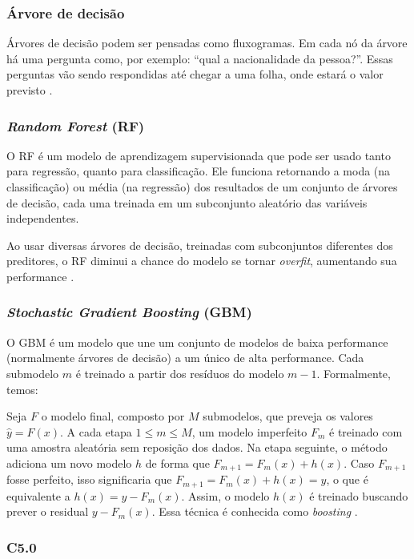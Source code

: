 \documentclass[a4paper,titlepage]{ppgi}\usepackage[]{graphicx}\usepackage[]{color}
\begin{document}
\subsubsection{Árvore de decisão}

Árvores de decisão podem ser pensadas como fluxogramas. Em cada nó da árvore há
uma pergunta como, por exemplo: ``qual a nacionalidade da pessoa?''. Essas
perguntas vão sendo respondidas até chegar a uma folha, onde estará o valor
previsto \cite{Kuhn2013}.

\subsubsection{\emph{Random Forest} (RF)}

O \gls{RF} é um modelo de aprendizagem supervisionada que pode ser usado tanto
para regressão, quanto para classificação. Ele funciona retornando a moda (na
classificação) ou média (na regressão) dos resultados de um conjunto de árvores
de decisão, cada uma treinada em um subconjunto aleatório das variáveis
independentes.

Ao usar diversas árvores de decisão, treinadas com subconjuntos diferentes dos
preditores, o \gls{RF} diminui a chance do modelo se tornar \emph{overfit},
aumentando sua performance \cite{Kuhn2013}.

\subsubsection{\emph{Stochastic Gradient Boosting} (GBM)}

O \gls{GBM} é um modelo que une um conjunto de modelos de baixa performance
(normalmente árvores de decisão) a um único de alta performance. Cada submodelo
$m$ é treinado a partir dos resíduos do modelo $m - 1$. Formalmente, temos:

Seja $F$ o modelo final, composto por $M$ submodelos, que preveja os valores
$\hat{y} = F(x)$. A cada etapa $1 \le m \le M$, um modelo imperfeito $F_m$ é
treinado com uma amostra aleatória sem reposição dos dados. Na etapa seguinte,
o método adiciona um novo modelo $h$ de forma que $F_{m + 1} = F_m(x) + h(x)$.
Caso $F_{m + 1}$ fosse perfeito, isso significaria que $F_{m + 1} = F_m(x) +
h(x) = y$, o que é equivalente a $h(x) = y - F_m(x)$. Assim, o modelo $h(x)$ é
treinado buscando prever o residual $y - F_m(x)$. Essa técnica é conhecida como
\emph{boosting} \cite{Kuhn2013}.

\subsubsection{C5.0}
\end{document}
